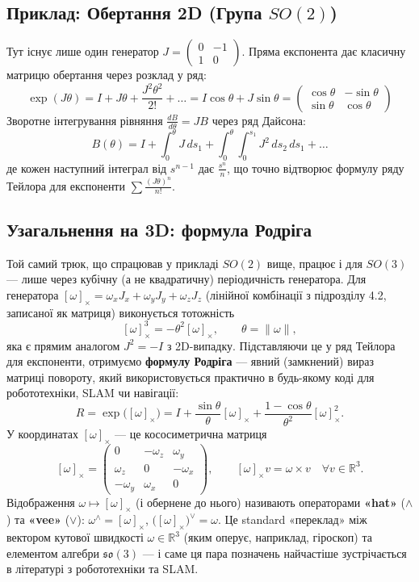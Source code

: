 \documentclass[12pt, a4paper]{article}
\begin{document}
	\subsection{Приклад: Обертання 2D (Група $SO(2)$)}
	Тут існує лише один генератор $J = \left(\begin{smallmatrix} 0 & -1 \\ 1 & 0 \end{smallmatrix}\right)$.
	Пряма експонента дає класичну матрицю обертання через розклад у ряд:
	\[ \exp(J\theta) = I + J\theta + \frac{J^2\theta^2}{2!} + \dots = I \cos\theta + J \sin\theta = \begin{pmatrix} \cos\theta & -\sin\theta \\ \sin\theta & \cos\theta \end{pmatrix} \]
	Зворотне інтегрування рівняння $\frac{dB}{d\theta} = JB$ через ряд Дайсона:
	\[ B(\theta) = I + \int_{0}^{\theta} J \, ds_1 + \int_{0}^{\theta} \int_{0}^{s_1} J^2 \, ds_2 \, ds_1 + \dots \]
	де кожен наступний інтеграл від $s^{n-1}$ дає $\frac{s^n}{n}$, що точно відтворює формулу ряду Тейлора для експоненти $\sum \frac{(J\theta)^n}{n!}$.
	
	\subsection{Узагальнення на 3D: формула Родріга}
	Той самий трюк, що спрацював у прикладі $SO(2)$ вище, працює і для $SO(3)$ — лише через кубічну (а не квадратичну) періодичність генератора. Для генератора $[\omega]_\times = \omega_x J_x + \omega_y J_y + \omega_z J_z$ (лінійної комбінації з підрозділу 4.2, записаної як матриця) виконується тотожність
	\[ [\omega]_\times^3 = -\theta^2 [\omega]_\times, \qquad \theta = \|\omega\|, \]
	яка є прямим аналогом $J^2=-I$ з 2D-випадку. Підставляючи це у ряд Тейлора для експоненти, отримуємо \textbf{формулу Родріга} — явний (замкнений) вираз матриці повороту, який використовується практично в будь-якому коді для робототехніки, SLAM чи навігації:
	\[
	R = \exp\!\big([\omega]_\times\big) = I + \frac{\sin\theta}{\theta}[\omega]_\times + \frac{1-\cos\theta}{\theta^2}[\omega]_\times^2 .
	\]
	У координатах $[\omega]_\times$ — це кососиметрична матриця
	\[
	[\omega]_\times = \begin{pmatrix} 0 & -\omega_z & \omega_y \\ \omega_z & 0 & -\omega_x \\ -\omega_y & \omega_x & 0 \end{pmatrix}, \qquad [\omega]_\times v = \omega \times v \quad \forall v \in \mathbb{R}^3.
	\]
	Відображення $\omega \mapsto [\omega]_\times$ (і обернене до нього) називають операторами \textbf{«hat»} ($\wedge$) та \textbf{«vee»} ($\vee$): $\omega^\wedge = [\omega]_\times$, $\big([\omega]_\times\big)^\vee = \omega$. Це standard «переклад» між вектором кутової швидкості $\omega \in \mathbb{R}^3$ (яким оперує, наприклад, гіроскоп) та елементом алгебри $\mathfrak{so}(3)$ — і саме ця пара позначень найчастіше зустрічається в літературі з робототехніки та SLAM.
	
\end{document}
